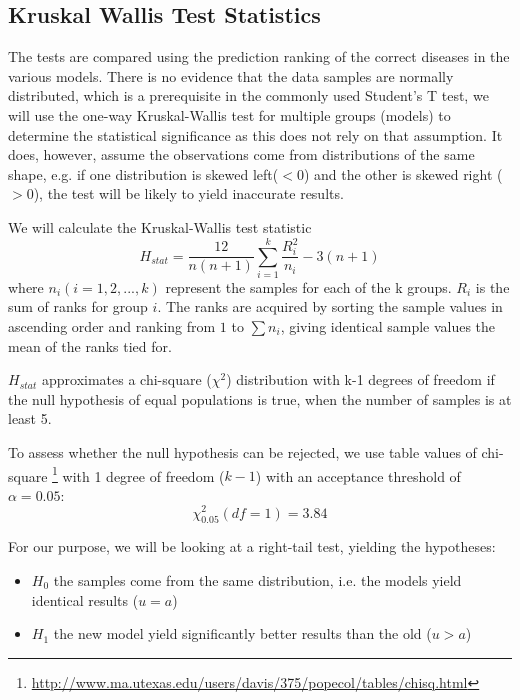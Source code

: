 \documentclass[10pt,letterpaper,final]{article}
\begin{document}
\subsection{Kruskal Wallis Test Statistics}
The tests are compared using the prediction ranking of the correct
diseases in the various models. There is no evidence that the data
samples are normally distributed, which is a prerequisite in the
commonly used Student's T test, we will use the one-way Kruskal-Wallis
\cite{kruskalwallis} test for multiple groups (models) to determine the
statistical significance as this does not rely on that assumption. It
does, however, assume the observations come from distributions of the
same shape, e.g. if one distribution is skewed left($<0$) and the other
is skewed right ($>0$), the test will be likely to yield inaccurate
results.

We will calculate the Kruskal-Wallis test statistic
\[
H_{stat} = \frac{12}{n(n+1)}\sum\limits_{i = 1}^{k} \frac{R^{2}_{i}}{n_{i}} - 3(n+1)
\]
where $n_{i} (i = 1, 2, ..., k)$ represent the samples for each of
the k groups. $R_{i}$ is the sum of ranks for group $i$. The ranks are
acquired by sorting the sample values in ascending order and ranking
from $1$ to $\sum n_{i}$, giving identical sample values the mean of the
ranks tied for.

$H_{stat}$ approximates a chi-square ($\chi^2$) distribution with k-1
degrees of freedom if the null hypothesis of equal populations is true,
when the number of samples is at least 5.

To assess whether the null hypothesis can be rejected, we use table
values of chi-square
\footnote{\url{http://www.ma.utexas.edu/users/davis/375/popecol/tables/chisq.html}}
with 1 degree of freedom ($k-1$) with an acceptance threshold of $\alpha
= 0.05$:
\[
\chi^2_{0.05}(df=1) = 3.84
\]



For our purpose, we will be looking at a right-tail test, yielding the
hypotheses:
\begin{itemize}
\item $H_{0}$ the samples come from the same distribution, i.e. the models yield identical results ($u = a$)
\item $H_{1}$ the new model yield significantly better results than the old ($u > a$)
\end{itemize}
\end{document}
